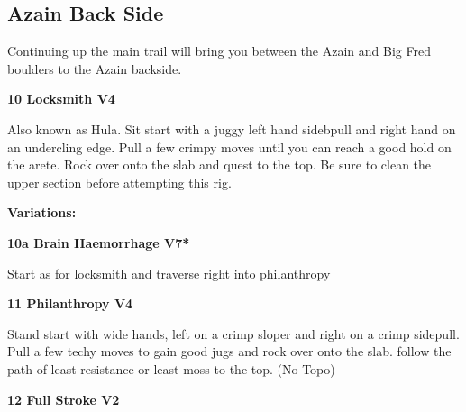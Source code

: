 \begin{multicols}{2}
			\subsection*{Azain Back Side}\label{bf:Azain Back Side}
			\begin{minipage}{\columnwidth}
			Continuing up the main trail will bring you between the Azain and Big Fred boulders to the Azain backside.
			\end{minipage}
			

					\begin{minipage}{\linewidth}	
					\label{rt:Locksmith}
\colorbox{RoyalBlue!20}{
\parbox{0.95\textwidth}{
\textbf{
10 Locksmith V4     \warn \warn 
}
}
}

					\begin{adjustwidth}{0.5cm}{}				
					Also known as Hula. Sit start with a juggy left hand sidebpull and right hand on an undercling edge. Pull a few crimpy moves until you can reach a good hold on the arete. Rock over onto the slab and quest to the top. Be sure to clean the upper section before attempting this rig.
					\end{adjustwidth}
					\end{minipage}
						\begin{adjustwidth}{0.5cm}{}				
						\textbf{Variations:} \newline
							\begin{minipage}{\linewidth}	
							\label{vr:Brain Haemorrhage}
\colorbox{Goldenrod!50}{
\parbox{0.95\textwidth}{
\textbf{
10a Brain Haemorrhage V7*  
}
}
}

							\begin{adjustwidth}{0.5cm}{}				
							Start as for locksmith and traverse right into philanthropy
							\end{adjustwidth}
							\end{minipage}
						\end{adjustwidth}
					\begin{minipage}{\linewidth}	
					\label{rt:Philanthropy}
\colorbox{RoyalBlue!20}{
\parbox{0.95\textwidth}{
\textbf{
11 Philanthropy V4   \warn \warn 
}
}
}

					\begin{adjustwidth}{0.5cm}{}				
					Stand start with wide hands, left on a crimp sloper and right on a crimp sidepull. Pull a few techy moves to gain good jugs and rock over onto the slab. follow the path of least resistance or least moss to the top.
						\newline (No Topo) 
					\end{adjustwidth}
					\end{minipage}
					\begin{minipage}{\linewidth}	
					\label{rt:Full Stroke}
\colorbox{green!20}{
\parbox{0.95\textwidth}{
\textbf{
12 Full Stroke V2    \warn 
}
}
}


\end{minipage}
\end{multicols}
